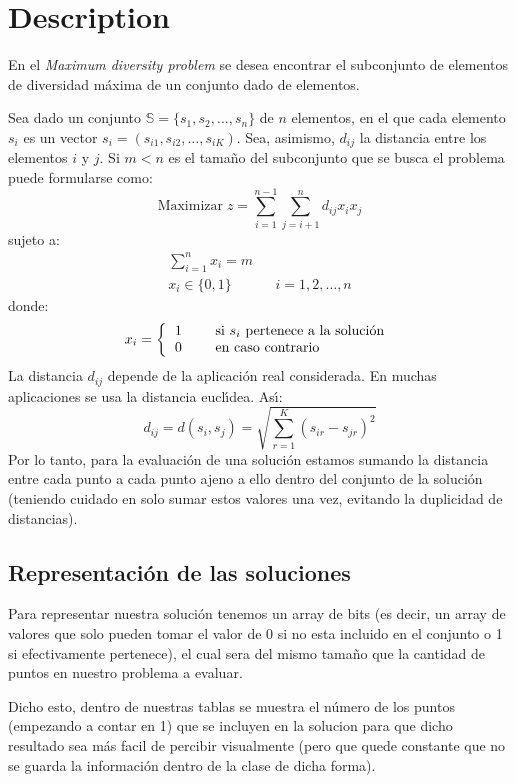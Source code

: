 \section{Description}
En el {\em Maximum diversity problem} se desea encontrar el subconjunto de elementos de diversidad m\'axima de un conjunto dado de elementos.

Sea dado un conjunto $\mathbb{S} = \{s_1, s_2, \ldots, s_n\}$ de $n$ elementos, en el que cada elemento $s_i$ es un vector $s_i = (s_{i1}, s_{i2}, \ldots, s_{iK})$. Sea, asimismo, $d_{ij}$ la distancia entre los elementos $i$ y $j$. Si $m < n$ es el tama\~no del subconjunto que se busca el problema puede formularse como:
\[
\mbox{Maximizar}\; z = \sum_{i=1}^{n-1} \sum_{j=i+1}^n d_{ij} x_i x_j
\]
sujeto a:
\begin{eqnarray*}
   \sum_{i=1}^n x_i = m & & \\
   x_i \in \{0, 1\}     & & i = 1, 2, \ldots, n
\end{eqnarray*}
donde:
\[
   x_i = \left\{ \begin{tabular}{lcl}
                    1 & & \mbox{si $s_i$ pertenece a la soluci\'on}\\
                    0 & & \mbox{en caso contrario}\\
                 \end{tabular}\right.
\]
La distancia $d_{ij}$ depende de la aplicaci\'on real considerada. En muchas aplicaciones se usa la distancia eucl\'{\i}dea. As\'{\i}:
\[
   d_{ij} = d(s_i, s_j) = \sqrt{\sum_{r=1}^K (s_{ir} - s_{jr})^2}
\]
Por lo tanto, para la evaluación de una solución estamos sumando la distancia entre cada punto a cada punto ajeno a ello dentro del conjunto de la solución (teniendo cuidado en solo sumar estos valores una vez, evitando la duplicidad de distancias).


\subsection{Representaci\'on de las soluciones}

Para representar nuestra solución tenemos un array de bits (es decir, un array de valores que solo pueden tomar el valor de 0 si no esta incluido en el conjunto o 1 si efectivamente pertenece), el cual sera del mismo tamaño que la cantidad de puntos en nuestro problema a evaluar. 

Dicho esto, dentro de nuestras tablas se muestra el número de los puntos (empezando a contar en 1) que se incluyen en la solucion para que dicho resultado sea más facil de percibir visualmente (pero que quede constante que no se guarda la información dentro de la clase de dicha forma).

